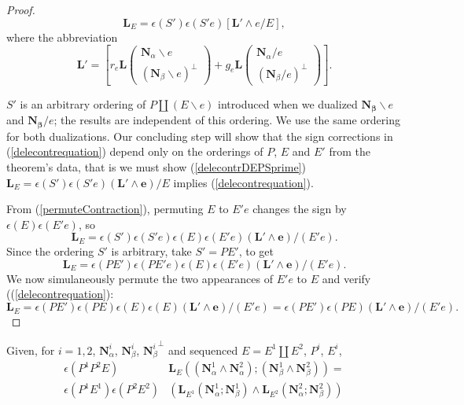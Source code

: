 \documentclass[Unicode]{cedram-alco}
\newcommand{\ext}[1]{\ensuremath{\mathbf{#1}}}
\newcommand{\eNal}{\ensuremath{\ext{N}_{\alpha}}}
\newcommand{\eNbe}{\ensuremath{\ext{N}_\beta}}
\newcommand{\dunion}{\coprod}
\newcommand{\LHorSub}[3]{\ext{L}_{#1}\left(  {#2}; {#3}  \right)}
\begin{document}
\begin{proof}
\begin{equation}\label{delecontrDEPSprime}
  \ext{L}_E = \epsilon(S')\epsilon(S'e)
  \left[ \ext{L'} \wedge e /E \right],
\end{equation}
where the abbreviation        
\[
\ext{L'} = \left[
        r_e\ext{L}\left(
        \begin{array}{c} \eNal\backslash e \\
    (\eNbe\backslash e)^\perp
    \end{array}  \right) 
+
        g_e\ext{L}\left(
        \begin{array}{c} \eNal / e \\
    (\eNbe / e)^\perp \end{array} \right) 
        \right].
\]




$S'$ is an arbitrary ordering of $P\dunion (E\backslash e)$ introduced
when we dualized $\ext{N_\beta}\backslash e$ and
$\ext{N_\beta}/ e$; the results are independent of this ordering.
We use the same ordering for both dualizations.
Our concluding
step will show that the sign corrections in (\ref{delecontrequation}) depend only
on the orderings of $P$, $E$ and $E'$ from the theorem's data, that is
we must show (\ref{delecontrDEPSprime})
$\ext{L}_E=\epsilon(S')\epsilon(S'e)(\ext{L'}\wedge \ext{e})/E$
implies (\ref{delecontrequation}).

From (\ref{permuteContraction}),
permuting $E$ to $E'e$ changes the sign by $\epsilon(E)\epsilon(E'e)$, so
\[
\ext{L}_E=\epsilon(S')\epsilon(S'e)\epsilon(E)\epsilon(E'e)(\ext{L'}\wedge \ext{e})/(E'e).
\]
Since the ordering $S'$ is arbitrary, take $S'=PE'$, to get
\[
\ext{L}_E=\epsilon(PE')\epsilon(PE'e)\epsilon(E)\epsilon(E'e)(\ext{L'}\wedge \ext{e})/(E'e).
\]
We now simulaneously permute the two appearances of $E'e$ to $E$ and verify ((\ref{delecontrequation}):
\[
\ext{L}_E=\epsilon(PE')\epsilon(PE)\epsilon(E)\epsilon(E)(\ext{L'}\wedge \ext{e})/(E'e)
=\epsilon(PE')\epsilon(PE)(\ext{L'}\wedge \ext{e})/(E'e).
\]
\end{proof}




\begin{theo}\label{producttheorem}
Given, for $i = 1, 2$,
  $\ext{N}_\alpha^{i}$,  $\ext{N}_\beta^{i}$, ${\ext{N}_\beta^{i}}^\perp$ 
  and
  sequenced $E=E^{1}\dunion E^{2}$, $P^{i}$, $E^{i}$,
  \begin{equation}\label{productequation}
    \begin{split}
    \epsilon(P^1P^2E)
    &\LHorSub{E}
            {(\ext{N}_\alpha^{1}\wedge\ext{N}_\alpha^{2})}
            {(\ext{N}_\beta^{1}\wedge\ext{N}_\beta^{2})}
    = \\
    \epsilon(P^{1}E^{1})
    \epsilon(P^{2}E^{2}) 
        &\left(\LHorSub{E^{1}}{\ext{N}_\alpha^{1}}{\ext{N}_\beta^{1}}
        \wedge
        \LHorSub{E^{2}}{\ext{N}_\alpha^{2}}{\ext{N}_\beta^{2}}
          \right)
    \end{split}
  \end{equation}
\end{theo}
\end{document}
